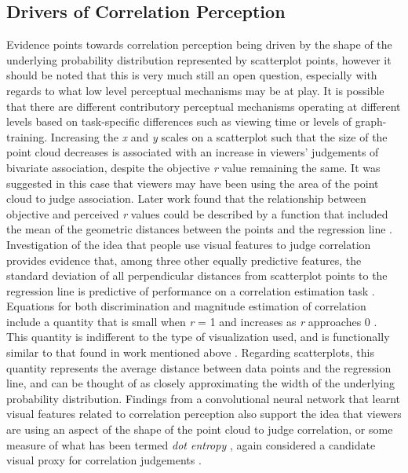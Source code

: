 \documentclass[manuscript, review, anonymous, screen]{acmart}
\begin{document}
\hypertarget{sec-drivers}{%
\subsection{Drivers of Correlation Perception}\label{sec-drivers}}

Evidence points towards correlation perception being driven by the shape
of the underlying probability distribution represented by scatterplot
points, however it should be noted that this is very much still an open
question, especially with regards to what low level perceptual
mechanisms may be at play. It is possible that there are different
contributory perceptual mechanisms operating at different levels based
on task-specific differences such as viewing time or levels of
graph-training. Increasing the \emph{x} and \emph{y} scales on a
scatterplot such that the size of the point cloud decreases
\citep{cleveland_1982} is associated with an increase in viewers'
judgements of bivariate association, despite the objective \emph{r}
value remaining the same. It was suggested in this case that viewers may
have been using the area of the point cloud to judge association. Later
work found that the relationship between objective and perceived
\emph{r} values could be described by a function that included the mean
of the geometric distances between the points and the regression line
\citep{meyer_1997}. Investigation of the idea that people use visual
features to judge correlation provides evidence that, among three other
equally predictive features, the standard deviation of all perpendicular
distances from scatterplot points to the regression line is predictive
of performance on a correlation estimation task \citep{yang_2019}.
Equations for both discrimination and magnitude estimation of
correlation include a quantity that is small when \emph{r} = 1 and
increases as \emph{r} approaches 0 \citep{rensink_2017}. This quantity
is indifferent to the type of visualization used, and is functionally
similar to that found in work mentioned above
\citep{cleveland_1982, meyer_1997, yang_2019}. Regarding scatterplots,
this quantity represents the average distance between data points and
the regression line, and can be thought of as closely approximating the
width of the underlying probability distribution. Findings from a
convolutional neural network that learnt visual features related to
correlation perception also support the idea that viewers are using an
aspect of the shape of the point cloud to judge correlation, or some
measure of what has been termed \emph{dot entropy} \citep{yang_2023},
again considered a candidate visual proxy for correlation judgements
\citep{rensink_2017, rensink_2022}.
\end{document}
